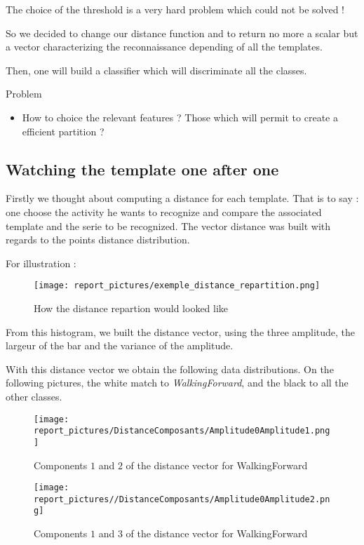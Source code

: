 \documentclass[a4,12pt]{article}
\begin{document}
	The choice of the threshold is a very hard problem which could not be solved ! 
	
	So we decided to change our distance function and to return no more a scalar but a vector characterizing the reconnaissance depending of all the templates.
	
	Then, one will build a classifier which will discriminate all the classes.
	
	Problem
	\begin{itemize}
		\item How to choice the relevant features ? Those which will permit to create a efficient partition ?
	\end{itemize}
	
	\subsection{Watching the template one after one}
	
	Firstly we thought about computing a distance for each template. That is to say : one choose the activity he wants to recognize and compare the associated template and the serie to be recognized. The vector distance was built with regards to the points distance distribution.

	For illustration :
	
	\begin{figure}[H]
		\centering
		\texttt{[image: report\_pictures/exemple\_distance\_repartition.png]}
		\caption{How the distance repartion would looked like}
		\label{ex_dist_rep}
	\end{figure}
	
	From this histogram, we built the distance vector, using the three amplitude, the largeur of the bar and the variance of the amplitude.
	
	With this distance vector we obtain the following data distributions. On the following pictures, the white match to \textit{WalkingForward}, and the black to all the other classes.
	
	
	\begin{figure}[H]
		\centering
		\texttt{[image: report\_pictures/DistanceComposants/Amplitude0Amplitude1.png]}
		\caption{Components $1$ and $2$ of the distance vector for WalkingForward}
		\label{dist_components}
	\end{figure}

	\begin{figure}[H]
		\centering
		\texttt{[image: report\_pictures//DistanceComposants/Amplitude0Amplitude2.png]}
		\caption{Components $1$ and $3$ of the distance vector for WalkingForward}
		\label{dist_components}
	\end{figure}
	
\end{document}
